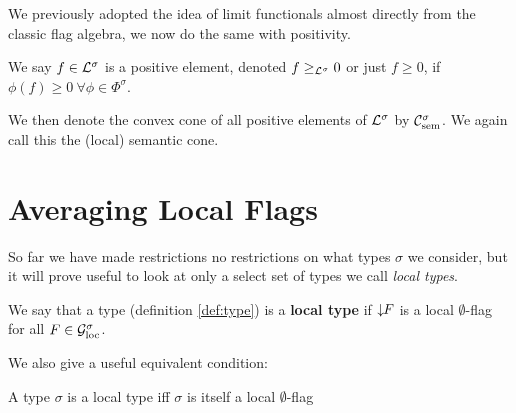 We previously adopted the idea of limit functionals almost directly from the
classic flag algebra, we now do the same with positivity. 
\begin{definition}
    We say $f\in\mathcal{L}^\sigma$ is a positive element, denoted $f \geq_{\mathcal{L}^\sigma} 0$ or
    just $f\geq 0$, if $\phi(f) \geq 0\ \forall \phi\in\Phi^\sigma$.
\end{definition} 

We then denote the convex cone of all positive elements of $\mathcal{L}^\sigma$ by
$\mathcal{C}_\mathrm{sem}^\sigma$. We again call this the (local) semantic cone.

\section{Averaging Local Flags}

So far we have made restrictions no restrictions on what types $\sigma$ we consider, but
it will prove useful to look at only a select set of types we call \textit{local types}.
\begin{definition}
    We say that a type (definition \ref{def:type}) is a \textbf{local type}
    if ${\downarrow\!\!F}$ is a local $\emptyset$-flag for all $F\in\mathcal{G}_\mathrm{loc}^\sigma$.
\end{definition}

We also give a useful equivalent condition:
\begin{lemma}
    \label{lemma:local_type_equiv}
    A type $\sigma$ is a local type iff $\sigma$ is itself a local $\emptyset$-flag
\end{lemma}

